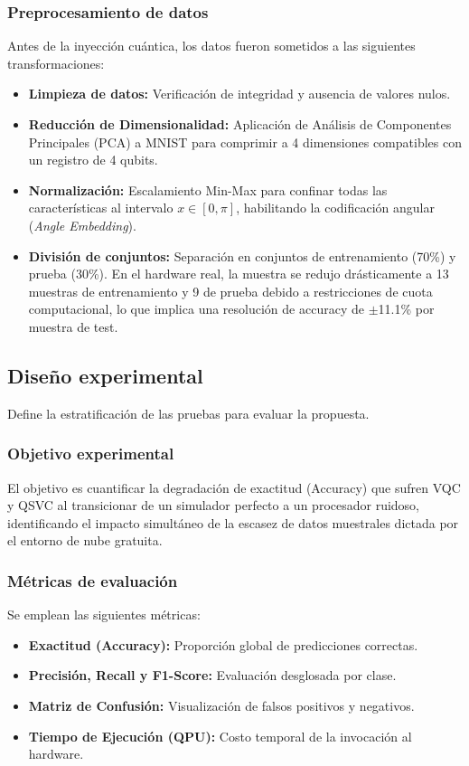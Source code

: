 \subsubsection{Preprocesamiento de datos}
Antes de la inyecci\'on cu\'antica, los datos fueron sometidos a las siguientes transformaciones:
\begin{itemize}
    \item \textbf{Limpieza de datos:} Verificaci\'on de integridad y ausencia de valores nulos.
    \item \textbf{Reducci\'on de Dimensionalidad:} Aplicaci\'on de An\'alisis de Componentes Principales (PCA) a MNIST para comprimir a 4 dimensiones compatibles con un registro de 4 qubits.
    \item \textbf{Normalizaci\'on:} Escalamiento Min-Max para confinar todas las caracter\'isticas al intervalo $x \in [0, \pi]$, habilitando la codificaci\'on angular (\textit{Angle Embedding}).
    \item \textbf{Divisi\'on de conjuntos:} Separaci\'on en conjuntos de entrenamiento (70\%) y prueba (30\%). En el hardware real, la muestra se redujo dr\'asticamente a 13 muestras de entrenamiento y 9 de prueba debido a restricciones de cuota computacional, lo que implica una resoluci\'on de accuracy de $\pm$11.1\% por muestra de test.
\end{itemize}

\subsection{Dise\~no experimental}
Define la estratificaci\'on de las pruebas para evaluar la propuesta.

\subsubsection{Objetivo experimental}
El objetivo es cuantificar la degradaci\'on de exactitud (Accuracy) que sufren VQC y QSVC al transicionar de un simulador perfecto a un procesador ruidoso, identificando el impacto simult\'aneo de la escasez de datos muestrales dictada por el entorno de nube gratuita.

\subsubsection{M\'etricas de evaluaci\'on}
Se emplean las siguientes m\'etricas:
\begin{itemize}
    \item \textbf{Exactitud (Accuracy):} Proporci\'on global de predicciones correctas.
    \item \textbf{Precisi\'on, Recall y F1-Score:} Evaluaci\'on desglosada por clase.
    \item \textbf{Matriz de Confusi\'on:} Visualizaci\'on de falsos positivos y negativos.
    \item \textbf{Tiempo de Ejecuci\'on (QPU):} Costo temporal de la invocaci\'on al hardware.
\end{itemize}


